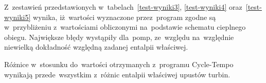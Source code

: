 Z~zestawień przedstawionych w~tabelach~\ref{test-wyniki3},
\ref{test-wyniki4} oraz~\ref{test-wyniki5} wynika, iż~wartości
wyznaczone przez~program zgodne są w~przybliżeniu z~wartościami
obliczonymi na~podstawie schematu cieplnego obiegu. Największe błędy
wystąpiły dla~pomp, ze~względu na~względnie niewielką dokładność
względną zadanej entalpii właściwej.

Różnice w~stosunku do~wartości otrzymanych z~programu Cycle-Tempo
wynikają przede~wszystkim z~różnic entalpii właściwej upustów turbin.


